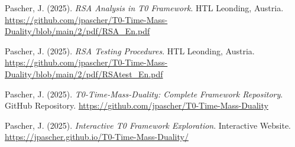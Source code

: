 \documentclass{article}
\begin{document}
\begin{thebibliography}{99}
		
		Pascher, J. (2025).
		\textit{RSA Analysis in T0 Framework}.
		HTL Leonding, Austria.
		\url{https://github.com/jpascher/T0-Time-Mass-Duality/blob/main/2/pdf/RSA_En.pdf}
		
		Pascher, J. (2025).
		\textit{RSA Testing Procedures}.
		HTL Leonding, Austria.
		\url{https://github.com/jpascher/T0-Time-Mass-Duality/blob/main/2/pdf/RSAtest_En.pdf}
		
		
		Pascher, J. (2025).
		\textit{T0-Time-Mass-Duality: Complete Framework Repository}.
		GitHub Repository.
		\url{https://github.com/jpascher/T0-Time-Mass-Duality}
		
		Pascher, J. (2025).
		\textit{Interactive T0 Framework Exploration}.
		Interactive Website.
		\url{https://jpascher.github.io/T0-Time-Mass-Duality/}
		
	\end{thebibliography}
	
\end{document}
